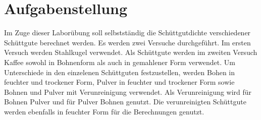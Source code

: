 \chapter{Aufgabenstellung}
\label{sec: Einleitung}

Im Zuge dieser Laborübung soll selbstständig die Schüttgutdichte verschiedener Schüttgute berechnet werden.
Es werden zwei Versuche durchgeführt. Im ersten Versuch werden Stahlkugel verwendet. 
Als Schüttgute werden im zweiten Versuch Kaffee sowohl in Bohnenform als auch in gemahlener Form verwendet. 
Um Unterschiede in den einzelenen Schüttguten festzustellen, werden Bohen in feuchter und trockener Form, 
Pulver in feuchter und trockener Form sowie Bohnen und Pulver mit Verunreinigung verwendet. Als Verunreinigung 
wird für Bohnen Pulver und für Pulver Bohnen genutzt. Die verunreinigten Schüttgute werden ebenfalls in feuchter Form 
für die Berechnungen genutzt.
\\
